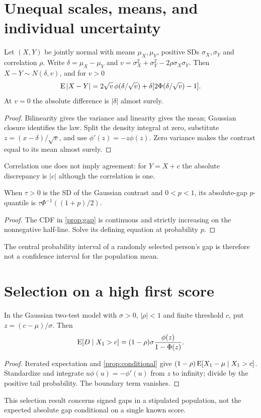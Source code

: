 \section{Unequal scales, means, and individual uncertainty}
\begin{proposition}\label{prop:heterogeneous}
Let $(X,Y)$ be jointly normal with means $\mu_X,\mu_Y$,
positive SDs $\sigma_X,\sigma_Y$ and correlation $\rho$.
Write $\delta=\mu_X-\mu_Y$ and
$v=\sigma_X^2+\sigma_Y^2-2\rho\sigma_X\sigma_Y$.
Then $X-Y\sim N(\delta,v)$, and for $v>0$
\[
\operatorname{E}|X-Y|=2\sqrt v\,\phi(\delta/\sqrt v)
+\delta[2\Phi(\delta/\sqrt v)-1].
\]
At $v=0$ the absolute difference is $|\delta|$ almost surely.
\end{proposition}
\begin{proof}
Bilinearity gives the variance and linearity gives the mean;
Gaussian closure identifies the law. Split the density integral at zero,
substitute $z=(x-\delta)/\sqrt v$, and use $\phi'(z)=-z\phi(z)$.
Zero variance makes the contrast equal to its mean almost surely.
\end{proof}
Correlation one does not imply agreement: for $Y=X+c$ the absolute
discrepancy is $|c|$ although the correlation is one.
\begin{proposition}\label{prop:quantile}
When $\tau>0$ is the SD of the Gaussian contrast and $0<p<1$,
its absolute-gap $p$-quantile is $\tau\Phi^{-1}((1+p)/2)$.
\end{proposition}
\begin{proof}
The CDF in \cref{prop:gap} is continuous and strictly increasing on
the nonnegative half-line. Solve its defining equation at probability $p$.
\end{proof}
The central probability interval of a randomly selected person's
gap is therefore not a confidence interval for the population mean.

\section{Selection on a high first score}
\begin{proposition}\label{prop:selection}
In the Gaussian two-test model with $\sigma>0$, $|\rho|<1$ and finite
threshold $c$, put $z=(c-\mu)/\sigma$. Then
\[
\operatorname{E}[D\mid X_1>c]=(1-\rho)\sigma
\frac{\phi(z)}{1-\Phi(z)}.
\]
\end{proposition}
\begin{proof}
Iterated expectation and \cref{prop:conditional} give
$(1-\rho)\operatorname{E}[X_1-\mu\mid X_1>c]$.
Standardize and integrate $u\phi(u)=-\phi'(u)$ from $z$ to infinity;
divide by the positive tail probability. The boundary term vanishes.
\end{proof}
This selection result concerns signed gaps in a stipulated population,
not the expected absolute gap conditional on a single known score.

